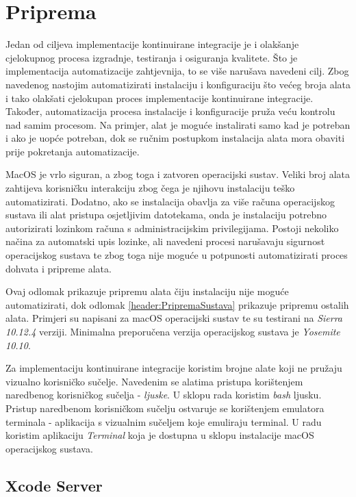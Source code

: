 \documentclass[times, utf8, diplomski, numeric]{fer}
\begin{document}



\section{Priprema}

Jedan od ciljeva implementacije kontinuirane integracije je i olakšanje cjelokupnog procesa izgradnje, testiranja i osiguranja kvalitete. Što je implementacija automatizacije zahtjevnija, to se više narušava navedeni cilj. Zbog navedenog nastojim automatizirati instalaciju i konfiguraciju što većeg broja alata i tako olakšati cjelokupan proces implementacije kontinuirane integracije. Također, automatizacija procesa instalacije i konfiguracije pruža veću kontrolu nad samim procesom. Na primjer, alat je moguće instalirati samo kad je potreban i ako je uopće potreban, dok se ručnim postupkom instalacija alata mora obaviti prije pokretanja automatizacije.

MacOS je vrlo siguran, a zbog toga i zatvoren operacijski sustav. Veliki broj alata zahtijeva korisničku interakciju zbog čega je njihovu instalaciju teško automatizirati. Dodatno, ako se instalacija obavlja za više računa operacijskog sustava ili alat pristupa osjetljivim datotekama, onda je instalaciju potrebno autorizirati lozinkom računa s administracijskim privilegijama. Postoji nekoliko načina za automatski upis lozinke, ali navedeni procesi narušavaju sigurnost operacijskog sustava te zbog toga nije moguće u potpunosti automatizirati proces dohvata i pripreme alata.

Ovaj odlomak prikazuje pripremu alata čiju instalaciju nije moguće automatizirati, dok odlomak \ref{header:PripremaSustava} prikazuje pripremu ostalih alata. Primjeri su napisani za macOS operacijski sustav te su testirani na \textit{Sierra 10.12.4} verziji. Minimalna preporučena verzija operacijskog sustava je \textit{Yosemite 10.10}.

Za implementaciju kontinuirane integracije koristim brojne alate koji ne pružaju vizualno korisničko sučelje. Navedenim se alatima pristupa korištenjem naredbenog korisničkog sučelja - \textit{ljuske}. U sklopu rada koristim \textit{bash} ljusku. Pristup naredbenom korisničkom sučelju ostvaruje se korištenjem emulatora terminala - aplikacija s vizualnim sučeljem koje emuliraju terminal. U radu koristim aplikaciju \textit{Terminal} koja je dostupna u sklopu instalacije macOS operacijskog sustava.

\subsection{Xcode Server}
\end{document}
